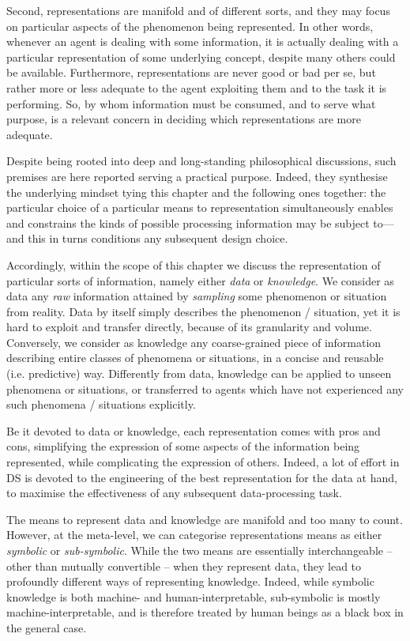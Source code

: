 \documentclass[12pt,a4paper,openright,twoside]{book}
\begin{document}
Second, representations are manifold and of different sorts, and they may focus on particular aspects of the phenomenon being represented.
%
In other words, whenever an agent is dealing with some information, it is actually dealing with a particular representation of some underlying concept, despite many others could be available.
%
Furthermore, representations are never good or bad per se, but rather more or less adequate to the agent exploiting them and to the task it is performing.
%
So, by whom information must be consumed, and to serve what purpose, is a relevant concern in deciding which representations are more adequate.


%

Despite being rooted into deep and long-standing philosophical discussions, such premises are here reported serving a practical purpose.
%
Indeed, they synthesise the underlying mindset tying this chapter and the following ones together: the particular choice of a particular means to representation simultaneously enables and constrains the kinds of possible processing information may be subject to---and this in turns conditions any subsequent design choice.

Accordingly, within the scope of this chapter we discuss the representation of particular sorts of information, namely either \emph{data} or \emph{knowledge}.
%
We consider as data any \emph{raw} information attained by \emph{sampling} some phenomenon or situation from reality.
%
Data by itself simply describes the phenomenon / situation, yet it is hard to exploit and transfer directly, because of its granularity and volume.
%
Conversely, we consider as knowledge any coarse-grained piece of information describing entire classes of phenomena or situations, in a concise and reusable (i.e. predictive) way.
%
Differently from data, knowledge can be applied to unseen phenomena or situations, or transferred to agents which have not experienced any such phenomena / situations explicitly.

Be it devoted to data or knowledge, each representation comes with pros and cons, simplifying the expression of some aspects of the information being represented, while complicating the expression of others.
%
Indeed, a lot of effort in DS is devoted to the engineering of the best representation for the data at hand, to maximise the effectiveness of any subsequent data-processing task.

The means to represent data and knowledge are manifold and too many to count.
%
However, at the meta-level, we can categorise representations means as either \emph{symbolic} or \emph{sub-symbolic}.
%
While the two means are essentially interchangeable -- other than mutually convertible -- when they represent data, they lead to profoundly different ways of representing knowledge.
%
Indeed, while symbolic knowledge is both machine- and human-interpretable, sub-symbolic is mostly machine-interpretable, and is therefore treated by human beings as a black box in the general case.
\end{document}
